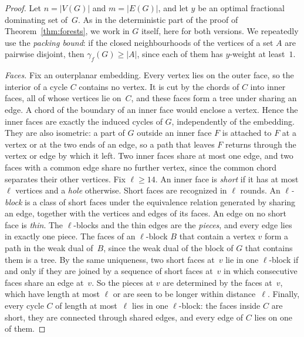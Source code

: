 \documentclass[11pt]{article}
\theoremstyle{remark}
\begin{document}
\begin{proof}
Let $n=|V(G)|$ and $m=|E(G)|$, and let $y$ be an optimal fractional dominating set of~$G$. As in the
deterministic part of the proof of Theorem~\ref{thm:forests}, we work in $G$ itself, here for both
versions. We repeatedly use the \emph{packing bound}: if the closed
neighbourhoods of the vertices of a set $A$ are pairwise disjoint, then $\gamma_f(G)\ge|A|$, since
each of them has $y$-weight at least~$1$.

\emph{Faces.} Fix an outerplanar embedding. Every vertex lies on the outer face, so the interior of a
cycle $C$ contains no vertex. It is cut by the chords of $C$ into inner faces, all of whose vertices
lie on~$C$, and these faces form a tree under sharing an edge. A chord of the boundary of an inner
face would enclose a vertex. Hence the inner faces are exactly the induced cycles of $G$,
independently of the embedding. They are also isometric: a part of $G$ outside an inner face $F$ is
attached to $F$ at a vertex or at the two ends of an edge, so a path that leaves $F$ returns through
the vertex or edge by which it left. Two inner faces share at most one edge, and two faces with a
common edge share no further vertex, since the common chord separates their other vertices. Fix
$\ell\ge14$. An inner face is \emph{short} if it has at most $\ell$ vertices and a \emph{hole}
otherwise. Short faces are recognized in $\ell$ rounds. An \emph{$\ell$-block} is a class of short faces
under the equivalence relation generated by sharing an edge, together with the vertices and edges
of its faces. An edge on no short face is \emph{thin}. The $\ell$-blocks and the thin edges are the
\emph{pieces}, and every edge lies in exactly one piece. The faces of an $\ell$-block $B$ that
contain a vertex $v$ form a path in the weak dual of~$B$, since the weak dual of the block of $G$ that
contains them is a tree. By the same uniqueness, two short faces at~$v$ lie in one $\ell$-block if
and only if they are joined by a sequence of short faces at~$v$ in which consecutive faces share an
edge at~$v$. So the pieces at $v$ are determined by the faces at~$v$, which have length at most $\ell$
or are seen to be longer within distance~$\ell$. Finally, every cycle $C$ of length at most~$\ell$
lies in one $\ell$-block:
the faces inside $C$ are short, they are connected through shared edges, and every edge of $C$ lies
on one of them.


\end{proof}
\end{document}
